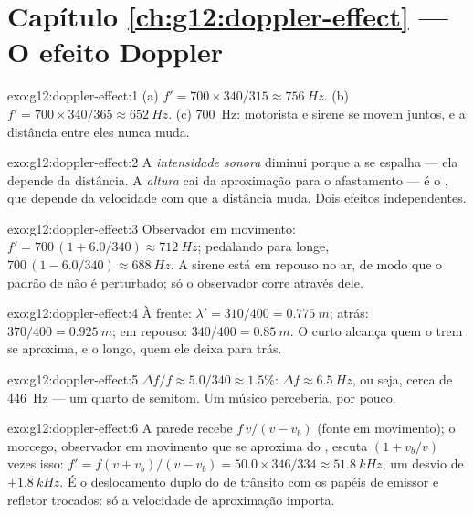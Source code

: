 \section*{Capítulo \ref{ch:g12:doppler-effect} --- O efeito Doppler}

\begin{solution}{exo:g12:doppler-effect:1}
(a) $f' = 700 \times 340/315 \approx \qty{756}{Hz}$.
(b) $f' = 700 \times 340/365 \approx \qty{652}{Hz}$.
(c) \qty{700}{Hz}: motorista e sirene se movem juntos, e a distância
entre eles nunca muda.
\end{solution}

\begin{solution}{exo:g12:doppler-effect:2}
A \emph{intensidade sonora} diminui porque a  se espalha --- ela
depende da distância. A \emph{altura} cai da aproximação para o
afastamento --- é o , que depende da velocidade com que a
distância muda. Dois efeitos independentes.
\end{solution}

\begin{solution}{exo:g12:doppler-effect:3}
Observador em movimento:
$f' = 700\,(1 + 6.0/340) \approx \qty{712}{Hz}$; pedalando para longe,
$700\,(1 - 6.0/340) \approx \qty{688}{Hz}$. A sirene está em repouso no
ar, de modo que o padrão de  não é perturbado; só o observador corre
através dele.
\end{solution}

\begin{solution}{exo:g12:doppler-effect:4}
À frente: $\lambda' = 310/400 = \qty{0.775}{m}$; atrás:
$370/400 = \qty{0.925}{m}$; em repouso:
$340/400 = \qty{0.85}{m}$. O  curto alcança quem o
trem se aproxima, e o longo, quem ele deixa para trás.
\end{solution}

\begin{solution}{exo:g12:doppler-effect:5}
$\Delta f/f \approx 5.0/340 \approx 1.5\%$: $\Delta f \approx
\qty{6.5}{Hz}$, ou seja, cerca de \qty{446}{Hz} --- um quarto de
semitom. Um músico perceberia, por pouco.
\end{solution}

\begin{solution}{exo:g12:doppler-effect:6}
A parede recebe $f\,v/(v - v_b)$ (fonte em movimento); o morcego,
observador em movimento que se aproxima do , escuta $(1 + v_b/v)$
vezes isso: $f' = f(v + v_b)/(v - v_b) = 50.0 \times 346/334 \approx
\qty{51.8}{kHz}$, um desvio de $+\qty{1.8}{kHz}$. É o deslocamento duplo
do  de trânsito com os papéis de emissor e refletor trocados: só a
velocidade de aproximação importa.
\end{solution}

